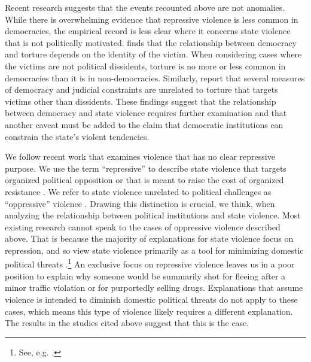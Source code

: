 \documentclass[11pt]{article}
\begin{document}
Recent research suggests that the events recounted above are not anomalies. While there is overwhelming evidence that repressive violence is less common in democracies, the empirical record is less clear where it concerns state violence that is not politically motivated. \citet{Haschke2018} finds that the relationship between democracy and torture depends on the identity of the victim. When considering cases where the victims are not political dissidents, torture is no more or less common in democracies than it is in non-democracies. Similarly, \citet{JacksonHillHall2018} report that several measures of democracy and judicial constraints are unrelated to torture that targets victims other than dissidents. These findings suggest that the relationship between democracy and state violence requires further examination and that another caveat must be added to the claim that democratic institutions can constrain the state's violent tendencies.     
   
We follow recent work that examines violence that has no clear repressive purpose. We use the term ``repressive'' to describe state violence that targets organized political opposition or that is meant to raise the cost of organized resistance \citep{Bisselletal1978,Tilly1978, Goldstein1978, StohlLopez1984,Davenport2007AR}. We refer to state violence unrelated to political challenges as ``oppressive'' violence \citep{Bisselletal1978}. Drawing this distinction is crucial, we think, when analyzing the relationship between political institutions and state violence. Most existing research cannot speak to the cases of oppressive violence described above. That is because the majority of explanations for state violence focus on repression, and so view state violence primarily as a tool for minimizing domestic political threats \citep{Haschke2018}.\footnote{See, e.g. \citep{Davenport1995,Poe2004,Pierskalla2010,Ritter2014,RitterConrad2016}.} An exclusive focus on repressive violence leaves us in a poor position to explain why someone would be summarily shot for fleeing after a minor traffic violation or for purportedly selling drugs. 
Explanations that assume violence is intended to diminish domestic political threats do not apply to these cases, which means this type of violence likely requires a different explanation. The results in the studies cited above suggest that this is the case.  
\end{document}
